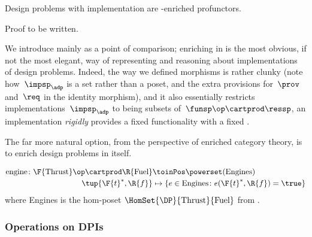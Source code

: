 {	\begin{proposition}
		Design problems with implementation are \Set-enriched profunctors.
	\end{proposition}
	\begin{publictodo}
		Proof to be written.
	\end{publictodo}
	We introduce \DPI mainly as a point of comparison; enriching in \Set is the most obvious, if not the most elegant, way of representing and reasoning about implementations of design problems.
	Indeed, the way we defined morphisms is rather clunky (note how~$\impsp_\adp$ is a set rather than a poset, and the extra provisions for~$\prov$ and~$\req$ in the identity morphism), and it also essentially restricts implementations~$\impsp_\adp$ to being subsets of~$\funsp\op \cartprod \ressp$, \ie  an implementation \emph{rigidly} provides a fixed functionality \fun with a fixed \res.

	The far more natural option, from the perspective of enriched category theory, is to enrich design problems in \DP itself.

	\begin{example}
		\begin{equation}
			\begin{aligned}
				\text{engine} \colon \F{\text{Thrust}}\op \cartprod \R{\text{Fuel}} & \toinPos \powerset(\text{Engines})                                  \\
				\tup{\F{t}^*,\R{f}}                                                 & \mapsto \{ e \in \text{Engines} \colon e(\F{t}^*, \R{f}) = \true \}
			\end{aligned}
		\end{equation}
		where Engines is the hom-poset $\HomSet{\DP}{\text{Thrust}}{\text{Fuel}}$ from \XXX. %
	\end{example}


	\subsubsection{Operations on DPIs}
}

